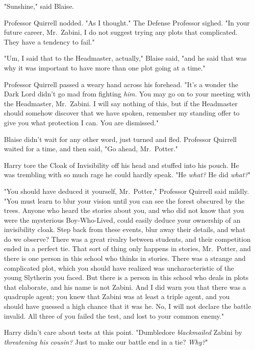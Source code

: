 "Sunshine," said Blaise.

Professor Quirrell nodded. "As I thought." The Defense Professor sighed. "In
your future career, Mr.~Zabini, I do not suggest trying any plots that
complicated. They have a tendency to fail."

"Um, I said that to the Headmaster, actually," Blaise said, "and he said that
was why it was important to have more than one plot going at a time."

Professor Quirrell passed a weary hand across his forehead. "It's a wonder the
Dark Lord didn't go mad from fighting \emph{him.} You may go on to your meeting
with the Headmaster, Mr.~Zabini. I will say nothing of this, but if the
Headmaster should somehow discover that we have spoken, remember my standing
offer to give you what protection I can. You are dismissed."

Blaise didn't wait for any other word, just turned and fled.
\sbreak
Professor Quirrell waited for a time, and then said, "Go ahead, Mr.~Potter."

Harry tore the Cloak of Invisibility off his head and stuffed into his pouch.
He was trembling with so much rage he could hardly speak. "He \emph{what?} He
did \emph{what?}"

"You should have deduced it yourself, Mr.~Potter," Professor Quirrell said
mildly. "You must learn to blur your vision until you can see the forest
obscured by the trees. Anyone who heard the stories about you, and who did not
know that you were the mysterious Boy-Who-Lived, could easily deduce your
ownership of an invisibility cloak. Step back from these events, blur away
their details, and what do we observe? There was a great rivalry between
students, and their competition ended in a perfect tie. That sort of thing only
happens in stories, Mr.~Potter, and there is one person in this school who
thinks in stories. There was a strange and complicated plot, which you should
have realized was uncharacteristic of the young Slytherin you faced. But there
is a person in this school who deals in plots that elaborate, and his name is
not Zabini. And I did warn you that there was a quadruple agent; you knew that
Zabini was at least a triple agent, and you should have guessed a high chance
that it was he. No, I will not declare the battle invalid. All three of you
failed the test, and lost to your common enemy."

Harry didn't care about tests at this point. "Dumbledore \emph{blackmailed}
Zabini by \emph{threatening his cousin?} Just to make our battle end in a tie?
\emph{Why?}"

